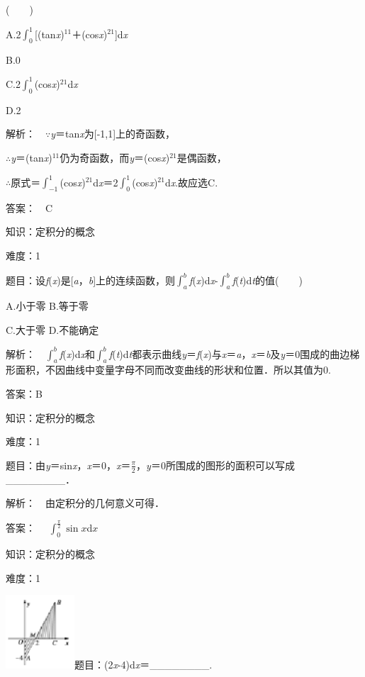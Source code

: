 \documentclass{article} %
\begin{document}
(　　)

A.2$\int_0^1$[(tan\textit{x})${}^{11}$＋(cos\textit{x})${}^{21}$]d\textit{x}

B.0

C.2$\int_0^1$(cos\textit{x})${}^{21}$d\textit{x}

D.2

 解析：　$\mathrm{\because}$\textit{y}＝tan\textit{x}为[-1,1]上的奇函数，

$\mathrm{\therefore}$\textit{y}＝(tan\textit{x})${}^{11}$仍为奇函数，而\textit{y}＝(cos\textit{x})${}^{21}$是偶函数，

$\mathrm{\therefore}$原式＝$\int_{-1}^{1}$(cos\textit{x})${}^{21}$d\textit{x}＝2$\int_0^1$(cos\textit{x})${}^{21}$d\textit{x}.故应选C.

 答案：　C



 知识：定积分的概念

 难度：1

 题目：设\textit{f}(\textit{x})是[\textit{a}，\textit{b}]上的连续函数，则$\int_a^b$\textit{f}(\textit{x})d\textit{x}-$\int_a^b$\textit{f}(\textit{t})d\textit{t}的值(　　)

A.小于零       B.等于零

C.大于零       D.不能确定

 解析：　$\int_a^b$\textit{f}(\textit{x})d\textit{x}和$\int_a^b$\textit{f}(\textit{t})d\textit{t}都表示曲线\textit{y}＝\textit{f}(\textit{x})与\textit{x}＝\textit{a}，\textit{x}＝\textit{b}及\textit{y}＝0围成的曲边梯形面积，不因曲线中变量字母不同而改变曲线的形状和位置．所以其值为0.

 答案：B



 知识：定积分的概念

 难度：1

 题目：由\textit{y}＝sin\textit{x}，\textit{x}＝0，\textit{x}＝$\frac{\pi}{2}$，\textit{y}＝0所围成的图形的面积可以写成\_\_\_\_\_\_\_\_．

 解析：　由定积分的几何意义可得．

 答案：　 $\int_0^{\frac{\pi}{2}}\sin x$d$x$



 

 知识：定积分的概念

 难度：1

 \includegraphics*[width=1.01in, height=1.08in, keepaspectratio=false]{image7}题目：(2\textit{x}-4)d\textit{x}＝\_\_\_\_\_\_\_\_.
\end{document}
